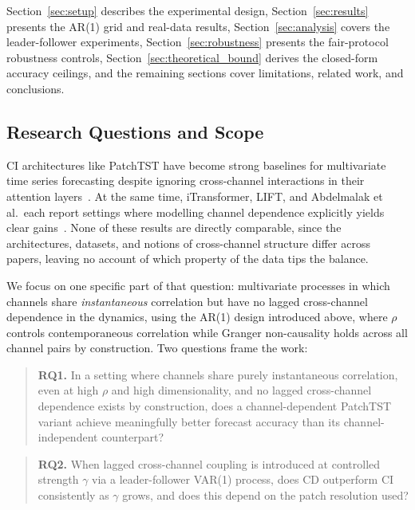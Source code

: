 \documentclass[10pt]{article} %
\begin{document}
    Section~\ref{sec:setup} describes the experimental design, Section~\ref{sec:results} presents the AR(1) grid and real-data
    results, Section~\ref{sec:analysis} covers the leader-follower experiments, Section~\ref{sec:robustness} presents the
    fair-protocol robustness controls, Section~\ref{sec:theoretical_bound} derives the closed-form accuracy ceilings, and the
    remaining sections cover limitations, related work, and conclusions.

    \subsection{Research Questions and Scope}

    CI architectures like PatchTST have become strong baselines for multivariate time series forecasting despite ignoring
    cross-channel interactions in their attention layers~\citep{nie2023patchtst}. At the same time, iTransformer, LIFT, and
    Abdelmalak et al.\ each report settings where modelling channel dependence explicitly yields clear
    gains~\citep{liu2024itransformer,zhao2024rethinkingchanneldependence,%
        abdelmalak2025channeldependence}. None of these results are directly comparable, since the architectures, datasets,
    and notions of cross-channel structure differ across papers, leaving no account of which property of the data tips the balance.

    We focus on one specific part of that question: multivariate processes in which channels share \emph{instantaneous}
    correlation but have no lagged cross-channel dependence in the dynamics, using the AR(1) design introduced above, where
    $\rho$ controls contemporaneous correlation while Granger non-causality holds across all channel pairs by construction.
    Two questions frame the work:

    \begin{quote}
        \textbf{RQ1.} In a setting where channels share purely instantaneous correlation, even at high $\rho$ and high
        dimensionality, and no lagged cross-channel dependence exists by construction, does a channel-dependent PatchTST variant
        achieve meaningfully better forecast accuracy than its channel-independent counterpart?
    \end{quote}

    \begin{quote}
        \textbf{RQ2.} When lagged cross-channel coupling is introduced at controlled strength $\gamma$ via a leader-follower
        VAR(1) process, does CD outperform CI consistently as $\gamma$ grows, and does this depend on the patch resolution used?
    \end{quote}
\end{document}
